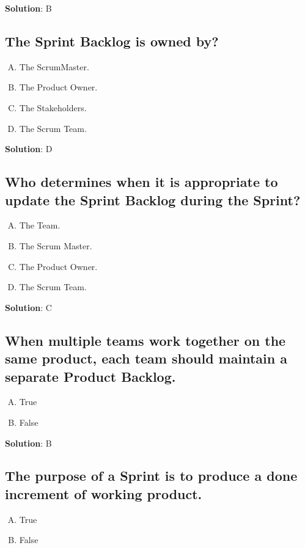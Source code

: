 \textbf{Solution}: B


\subsection{The Sprint Backlog is owned by?}
\begin{enumerate}[A)]
  \item The ScrumMaster.
  \item The Product Owner.
  \item The Stakeholders.
  \item The Scrum Team.
\end{enumerate}


\textbf{Solution}: D


\subsection{Who determines when it is appropriate to update the Sprint Backlog during the Sprint?}
\begin{enumerate}[A)]
  \item The Team.
  \item The Scrum Master.
  \item The Product Owner.
  \item The Scrum Team.
\end{enumerate}


\textbf{Solution}: C


\subsection{When multiple teams work together on the same product, each team should maintain a separate Product Backlog.}
\begin{enumerate}[A)]
  \item True
  \item False
\end{enumerate}


\textbf{Solution}: B


\subsection{The purpose of a Sprint is to produce a done increment of working product.}
\begin{enumerate}[A)]
  \item True
  \item False
\end{enumerate}


